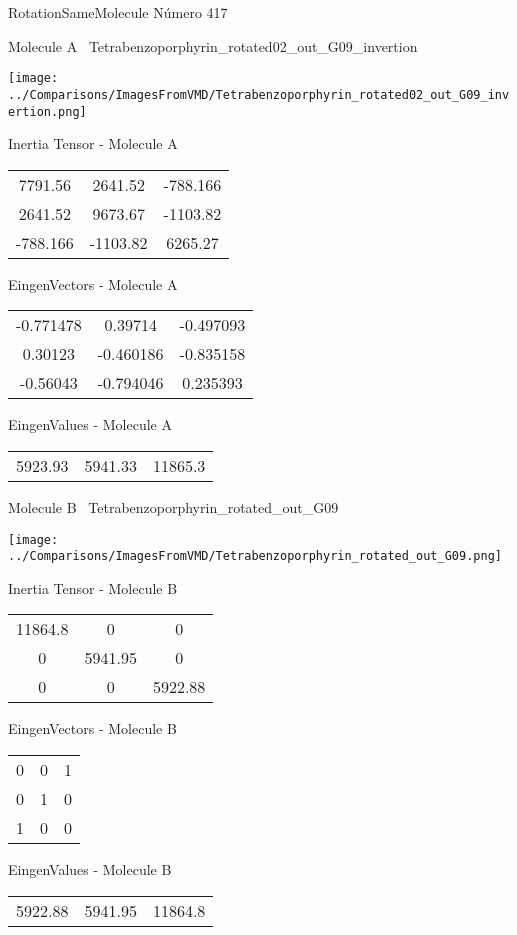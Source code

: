 \vtab[-3cm]
\begin{center}
{\large RotationSameMolecule \tab Número 417}
\end{center}
\begin{multicols}{2}
\begin{center}

Molecule A \
Tetrabenzoporphyrin\_rotated02\_out\_G09\_invertion

\texttt{[image: ../Comparisons/ImagesFromVMD/Tetrabenzoporphyrin\_rotated02\_out\_G09\_invertion.png]}

Inertia Tensor - Molecule A \\
\begin{tabular}{|c c c|}
7791.56	 & 	2641.52	 & 	-788.166	 \\
2641.52	 & 	9673.67	 & 	-1103.82	 \\
-788.166	 & 	-1103.82	 & 	6265.27
\end{tabular}

\vtab
 EingenVectors - Molecule A     \\
\begin{tabular}{|c c c|}
-0.771478	 & 	0.39714	 & 	-0.497093	 \\
0.30123	 & 	-0.460186	 & 	-0.835158	 \\
-0.56043	 & 	-0.794046	 & 	0.235393
\end{tabular}

\vtab
 EingenValues - Molecule A     \\
\begin{tabular}{|c c c|}
5923.93	 & 	5941.33	 & 	11865.3	 \\
\end{tabular}
\columnbreak

Molecule B \
Tetrabenzoporphyrin\_rotated\_out\_G09

\texttt{[image: ../Comparisons/ImagesFromVMD/Tetrabenzoporphyrin\_rotated\_out\_G09.png]}

Inertia Tensor - Molecule B \\
\begin{tabular}{|c c c|}
11864.8	 & 	0	 & 	0	 \\
0	 & 	5941.95	 & 	0	 \\
0	 & 	0	 & 	5922.88
\end{tabular}

\vtab
 EingenVectors - Molecule B     \\
\begin{tabular}{|c c c|}
0	 & 	0	 & 	1	 \\
0	 & 	1	 & 	0	 \\
1	 & 	0	 & 	0
\end{tabular}

\vtab
 EingenValues - Molecule B     \\
\begin{tabular}{|c c c|}
5922.88	 & 	5941.95	 & 	11864.8	 \\
\end{tabular}

\end{center}
\end{multicols}

